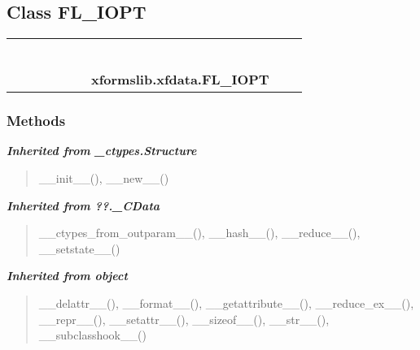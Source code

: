 \subsection{Class FL\_IOPT}

    \label{xformslib:xfdata:FL_IOPT}
\begin{tabular}{cccccccccc}
\multicolumn{2}{r}{\settowidth{\BCL}{object}\multirow{2}{\BCL}{object}}
&&
&&
&&
  \\\cline{3-3}
  &&\multicolumn{1}{c|}{}
&&
&&
&&
  \\
\multicolumn{4}{r}{\settowidth{\BCL}{??.\_CData}\multirow{2}{\BCL}{??.\_CData}}
&&
&&
  \\\cline{5-5}
  &&&&\multicolumn{1}{c|}{}
&&
&&
  \\
\multicolumn{6}{r}{\settowidth{\BCL}{\_ctypes.Structure}\multirow{2}{\BCL}{\_ctypes.Structure}}
&&
  \\\cline{7-7}
  &&&&&&\multicolumn{1}{c|}{}
&&
  \\
&&&&&&\multicolumn{2}{l}{\textbf{xformslib.xfdata.FL\_IOPT}}
\end{tabular}



  \subsubsection{Methods}


\large{\textbf{\textit{Inherited from \_ctypes.Structure}}}

\begin{quote}
\_\_init\_\_(), \_\_new\_\_()
\end{quote}

\large{\textbf{\textit{Inherited from ??.\_CData}}}

\begin{quote}
\_\_ctypes\_from\_outparam\_\_(), \_\_hash\_\_(), \_\_reduce\_\_(), \_\_setstate\_\_()
\end{quote}

\large{\textbf{\textit{Inherited from object}}}

\begin{quote}
\_\_delattr\_\_(), \_\_format\_\_(), \_\_getattribute\_\_(), \_\_reduce\_ex\_\_(), \_\_repr\_\_(), \_\_setattr\_\_(), \_\_sizeof\_\_(), \_\_str\_\_(), \_\_subclasshook\_\_()
\end{quote}

